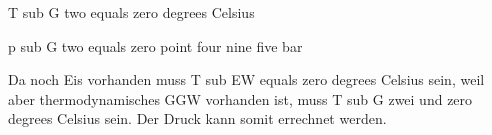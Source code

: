 T sub G two equals zero degrees Celsius

p sub G two equals zero point four nine five bar

Da noch Eis vorhanden muss T sub EW equals zero degrees Celsius sein, weil aber thermodynamisches GGW vorhanden ist, muss T sub G zwei und zero degrees Celsius sein. Der Druck kann somit errechnet werden.